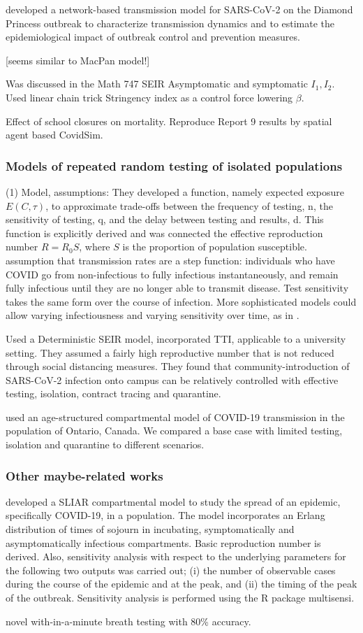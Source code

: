 \documentclass[12pt]{article}
\theoremstyle{definition} %
\begin{document}
\citep{jenness2020modeling} developed a network-based transmission model for SARS-CoV-2 on the Diamond Princess outbreak to characterize transmission dynamics and to estimate the epidemiological impact of outbreak control and prevention measures. 

\citep{elbanna2020entry} [seems similar to MacPan model!]

\citep{de2020influenza} Was discussed in the Math 747 
SEIR Asymptomatic and symptomatic $I_1, I_2$. Used linear chain trick 
Stringency index as a control force lowering $\beta$.

\citep{rice2020effect} Effect of school closures on mortality. Reproduce Report 9 results by spatial agent based CovidSim. 
\subsubsection{Models of repeated random testing of isolated populations}
\cite{bergstrom2020frequency}
(1) Model, assumptions: They developed a function, namely expected exposure $E(C,\tau)$, to approximate trade-offs between the frequency of testing, n, the sensitivity of testing, q, and the delay between
testing and results, d. This function is explicitly derived and was connected the effective reproduction number $R=R_0 S$, where $S$ is the proportion of population susceptible.
assumption that transmission rates are a step function: individuals who
have COVID go from non-infectious to fully infectious instantaneously,
and remain fully infectious until they are no longer able to transmit disease. Test sensitivity takes the same form over the course of infection.
More sophisticated models could allow varying infectiousness and varying
sensitivity over time, as in 
\citep{larremore2020test}.

\citep{lopman2020model} Used a Deterministic SEIR model, incorporated TTI, applicable to a university setting. They assumed a fairly high reproductive number that is not reduced through social
distancing measures. They found that community-introduction of SARS-CoV-2 infection onto campus can be
relatively controlled with effective testing, isolation, contract tracing and quarantine.

\citep{tuite2020mathematical} used an age-structured compartmental model of COVID-19 transmission in the population of Ontario, Canada. We compared a base case with limited testing, isolation and quarantine to different scenarios. 
\subsubsection{Other maybe-related works}
\citep{arino2020simple} developed a SLIAR compartmental model to study the spread of an epidemic, specifically COVID-19, in a population. The model incorporates an Erlang distribution of times of sojourn in incubating, symptomatically and asymptomatically infectious compartments. Basic reproduction number is derived. Also, sensitivity analysis with respect to the underlying parameters for the following two outputs was carried out; (i) the number of observable cases during the course of the epidemic and at the peak, and (ii) the timing of the peak of the outbreak. Sensitivity analysis is performed using the R package multisensi.

\citep{ruszkiewicz2020diagnosis} novel with-in-a-minute breath testing with 80\% accuracy. 
\end{document}
